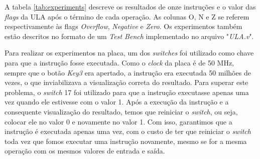 \documentclass[11pt,a4paper,titlepage]{article}
\begin{document}
A tabela \ref{tab:experiments} descreve os resultados de onze  instruções e o valor das \textit{flags} da 
ULA após o término de cada operação. As colunas O, N e Z se referem respectivamente às flags \textit{Overflow}, 
\textit{Negative} e \textit{Zero}. Os experimentos também estão descritos no formato de um \textit{Test Bench} 
implementado no arquivo "\textit{ULA.v}".

Para realizar os experimentos na placa, um dos \textit{switches} foi utilizado como chave para que a instrução fosse executada.
Como o \textit{clock} da placa é de 50 MHz, sempre que o botão \textit{Key3} era apertado, a instrução era executada 50 milhões de vezes, o que inviabilizava a visualização correta do resultado.
Para superar este problema, o \textit{switch} 17 foi utilizado para que a instrução executasse apenas uma vez quando ele estivesse com o valor 1.
Após a execução da instrução e a consequente visualização do resultado, temos que reiniciar o \textit{switch}, ou seja, colocar ele no valor 0 e novamente no valor 1.
Com isso, garantimos que a instrução é executada apenas uma vez, com o custo de ter que reiniciar o \textit{switch} toda vez que fomos executar uma instrução novamente, mesmo se for a mesma operação com os mesmos valores de entrada e saída.
\end{document}
